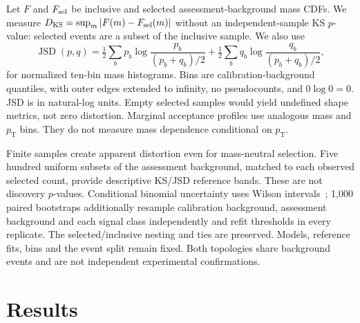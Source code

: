 \documentclass[11pt,a4paper]{article}
\newcommand{\pt}{p_{\mathrm T}}
\begin{document}
Let $F$ and $F_{\rm sel}$ be inclusive and selected assessment-background mass
CDFs. We measure $D_{\rm KS}=\sup_m|F(m)-F_{\rm sel}(m)|$ without an independent-sample
KS $p$-value: selected events are a subset of the inclusive sample. We also use
\begin{equation}
 \operatorname{JSD}(p,q)=\tfrac12\sum_b p_b\log\frac{p_b}{(p_b+q_b)/2}
 +\tfrac12\sum_b q_b\log\frac{q_b}{(p_b+q_b)/2},
\end{equation}
for normalized ten-bin mass histograms. Bins are calibration-background quantiles,
with outer edges extended to infinity, no pseudocounts, and $0\log0=0$. JSD is
in natural-log units. Empty selected samples would yield undefined shape metrics,
not zero distortion. Marginal acceptance profiles use analogous mass and $\pt$
bins. They do not measure mass dependence conditional on $\pt$.

Finite samples create apparent distortion even for mass-neutral selection.
Five hundred uniform subsets of the assessment background, matched to each
observed selected count, provide descriptive KS/JSD reference bands. These are
not discovery $p$-values. Conditional binomial uncertainty uses Wilson intervals~\cite{wilson};
1,000 paired bootstraps additionally resample calibration background, assessment
background and each signal class independently and refit thresholds in every
replicate. The selected/inclusive nesting and ties are preserved. Models,
reference fits, bins and the event split remain fixed. Both topologies share
background events and are not independent experimental confirmations.

\section{Results}
\end{document}
